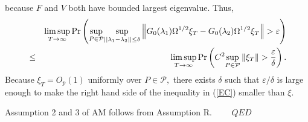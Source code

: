 \documentclass[11pt]{article}
\begin{document}
because $F$ and $V$ both have bounded largest eigenvalue. Thus,%
\begin{eqnarray}
&&\underset{T\rightarrow \infty }{\lim \sup }\Pr \left( \underset{P\in 
\mathcal{P}}{\sup }\underset{||\lambda _{1}-\lambda _{2}||\leq \delta }{\sup 
}\left \Vert G_{0}(\lambda _{1})\Omega ^{1/2}\xi _{T}-G_{0}(\lambda
_{2})\Omega ^{1/2}\xi _{T}\right \Vert >\varepsilon \right)  \notag \\
&\leq &\underset{T\rightarrow \infty }{\lim \sup }\Pr \left( C^{2}\underset{%
P\in \mathcal{P}}{\sup }\left \Vert \xi _{T}\right \Vert >\frac{\varepsilon 
}{\delta }\right) .  \label{EC}
\end{eqnarray}%
Because $\xi _{T}=O_{p}(1)$ uniformly over $P\in \mathcal{P},$ there exists $%
\delta $ such that $\varepsilon /\delta $ is large enough to make the right
hand side of the inequality in (\ref{EC}) smaller than $\xi .$

Assumption 2 and 3 of AM follows from Assumption R. $\qquad QED$

\bigskip

\bigskip
\end{document}
